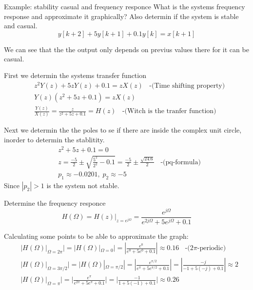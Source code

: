 \begin{exampleblock}{Example: stability casual and frequency responce} %
    What is the systems frequency response and approximate it graphically? Also determin if the system is 
    stable and casual. 
    \begin{equation*}
        y[k+2]+5y[k+1]+0.1y[k] = x[k+1]
    \end{equation*}

    We can see that the the output only depends on previus values there for 
    it can be casual.

    First we determin the systems transfer function
    \begin{align*}
        &z^2Y(z)+5zY(z)+0.1 = zX(z) \;\; \text{ -(Time shifting property)} \\
        &Y(z)(z^2+5z+0.1) = zX(z) \\
        &\frac{Y(z)}{X(z)} = \frac{z}{z^2+5z+0.1} = H(z) \;\; \text{ -(Witch is the tranfer function)}
    \end{align*}

    Next we determin the the poles to se if there are inside the complex unit circle, 
    inorder to determin the stablitity.
    \begin{align*}
        &z^2+5z+0.1 = 0 \\
        &z=\frac{-5}{2}\pm\sqrt{\frac{5^2}{2^2}-0.1}=\frac{-5}{2}\pm\frac{\sqrt{24.6}}{2} \;\; \text{ -(pq-formula)}\\
        &p_1\approx-0.0201, \; p_2\approx-5
    \end{align*}
    Since $|p_2|>1$ is the system not stable.

    Determine the frequency responce
    \begin{equation*}
        H(\Omega) = H(z)|_{z=e^{j\Omega}} = \frac{e^{j\Omega}}{e^{2j\Omega} + 5e^{j\Omega} + 0.1}
    \end{equation*}

    Calculating some points to be able to approximate the graph:
    \begin{align*}
        &|H(\Omega)|_{\Omega=2\pi}| = |H(\Omega)|_{\Omega=0}| = |\frac{e^0}{e^0+5e^0+0.1}| \approx 0.16 \;\; \text{ -($2\pi$-periodic)}\\
        &|H(\Omega)|_{\Omega=3\pi/2}| = |H(\Omega)|_{\Omega=\pi/2}| = |\frac{e^{\pi/2}}{e^{\pi}+5e^{\pi/2}+0.1}| = |\frac{-j}{-1+5(-j)+0.1}| \approx 2 \\
        &|H(\Omega)|_{\Omega=\pi}| = |\frac{e^{\pi}}{e^{2\pi}+5e^{\pi}+0.1}| = |\frac{-1}{1+5(-1)+0.1}| \approx 0.26
    \end{align*}
\end{exampleblock}


